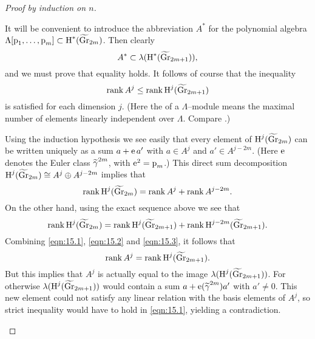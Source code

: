 \documentclass[../main]{subfiles}
\begin{document}
\begin{proof}[Proof by induction on $n$]
\begin{enumerate}[label = Case \arabic*.]
    It will be convenient to introduce the abbreviation $A^\ast$ for the polynomial algebra $\Lambda[\pontrjaginclass_1, \ldots, \pontrjaginclass_m] \subset \homology^\ast({\xtilde \grassmannian}_{2m})$. Then clearly \[A^\ast \subset \lambda(\homology^\ast({\xtilde \grassmannian}_{2m + 1})),\] and we must prove that equality holds. It follows of course that the inequality
\begin{equation}
\label{eqn:15.1}
\rank A^j \le \rank \homology^j({\xtilde \grassmannian}_{2m + 1})
\end{equation}
is satisfied for each dimension $j$. (Here the  of a $\Lambda$--module means the maximal number of elements linearly independent over $\Lambda$. Compare \cite[p. 52]{eilenbergsteenrod1952}.)

Using the induction hypothesis we see easily that every element of $\homology^j({\xtilde \grassmannian}_{2m})$ can be written uniquely as a sum $a + \operatorname{e} a'$ with $a \in A^j$ and $a' \in A^{j - 2m}$. (Here $\operatorname{e}$ denotes the Euler class ${\xtilde \gamma}^{2m}$, with $\operatorname{e}^2 = \operatorname{p}_m$.) This direct sum decomposition $\homology^j({\xtilde \grassmannian}_{2m}) \cong A^j \oplus A^{j - 2m}$ implies that
\begin{equation}
\label{eqn:15.2}
\rank \homology^j({\xtilde \grassmannian}_{2m}) = \rank A^j + \rank A^{j - 2m}.
\end{equation}
On the other hand, using the exact sequence above we see that 
\begin{equation}
\label{eqn:15.3}
\rank \homology^j({\xtilde \grassmannian}_{2m}) = \rank \homology^j({\xtilde \grassmannian}_{2m + 1}) + \rank \homology^{j - 2m}({\xtilde \grassmannian}_{2m + 1}).
\end{equation}
Combining \eqref{eqn:15.1}, \eqref{eqn:15.2} and \eqref{eqn:15.3}, it follows that \[\rank A^j = \rank \homology^j({\xtilde \grassmannian}_{2m + 1}).\] But this implies that $A^j$ is actually equal to the image $\lambda(\homology^j({\xtilde \grassmannian}_{2m + 1}))$. For otherwise $\lambda(\homology^j({\xtilde \grassmannian}_{2m + 1}))$ would contain a sum $a + \eulerclass({\xtilde \gamma}^{2m})a'$ with $a' \ne 0$. This new element could not satisfy any linear relation with the basis elements of $A^j$, so strict inequality would have to hold in \eqref{eqn:15.1}, yielding a contradiction. 
\end{enumerate}


\end{proof}
\end{document}
